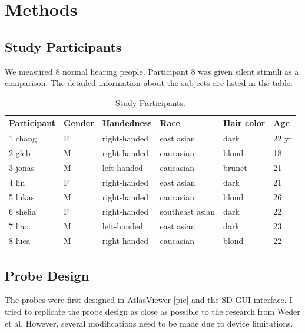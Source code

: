 \chapter{Methods}
\section {Study Participants}
We measured 8 normal hearing people. Participant 8 was given silent stimuli as a comparison. The detailed information about the subjects are listed in the table.

\begin{table}[h!]
  \begin{center}
    
    
    \begin{tabular}{p{2.3cm} | p{1.5cm} |p{3cm} | p{3cm} | p{2.5cm} | p{1cm}} %
      \textbf{Participant} & \textbf {Gender}& \textbf{Handedness} & \textbf{Race} & \textbf{Hair color} &\textbf {Age}\\ 
      \hline
      1 chang  & F & right-handed & east asian & dark & 22 yr \\
      2 gleb    & M & right-handed  & caucasian & blond & 18 \\
      3 jonas  & M & left-handed &  caucasian & brunet & 21\\
      4 lin      & F  & right-handed & east asian & dark& 21 \\
      5 lukas & M & right-handed  &  caucasian& blond & 26 \\
      6 shelia&  F & right-handed & southeast asian & dark & 22 \\
      7 liao.   &  M & left-handed &  east asian & dark & 23 \\
      8 luca & M & right-handed  & caucasian & blond & 22 \\
    \end{tabular}
    \label{tab:table1}
    \caption{Study Participants.}
  \end{center}
  
\end{table}

\section {Probe Design}
The probes were first designed in AtlasViewer [pic] \cite {10.1117/1.NPh.2.2.020801} and the SD GUI interface. I tried to replicate the probe design as close as possible to the research from Weder et al. However, several modifications need to be made due to device limitations.

